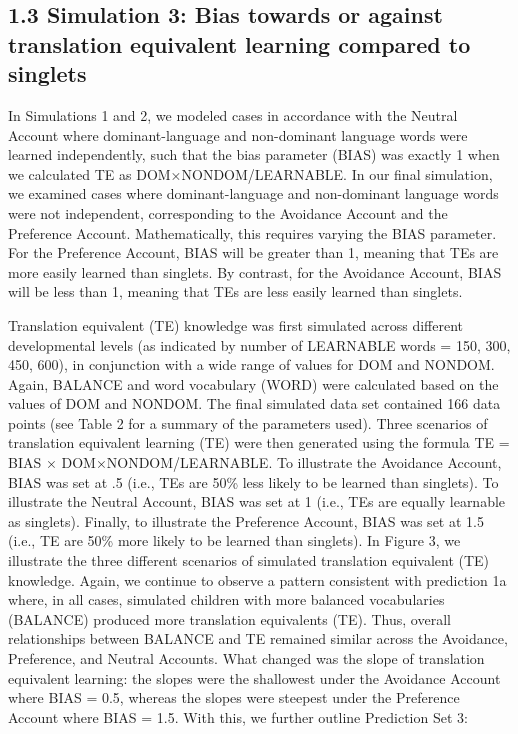 \documentclass[
  english,
  ,man,floatsintext]{apa6}
\begin{document}
\hypertarget{simulation-3-bias-towards-or-against-translation-equivalent-learning-compared-to-singlets}{%
\subsection{1.3 Simulation 3: Bias towards or against translation equivalent learning compared to singlets}\label{simulation-3-bias-towards-or-against-translation-equivalent-learning-compared-to-singlets}}

In Simulations 1 and 2, we modeled cases in accordance with the Neutral Account where dominant-language and non-dominant language words were learned independently, such that the bias parameter (BIAS) was exactly 1 when we calculated TE as DOM×NONDOM/LEARNABLE. In our final simulation, we examined cases where dominant-language and non-dominant language words were not independent, corresponding to the Avoidance Account and the Preference Account. Mathematically, this requires varying the BIAS parameter. For the Preference Account, BIAS will be greater than 1, meaning that TEs are more easily learned than singlets. By contrast, for the Avoidance Account, BIAS will be less than 1, meaning that TEs are less easily learned than singlets.

Translation equivalent (TE) knowledge was first simulated across different developmental levels (as indicated by number of LEARNABLE words = 150, 300, 450, 600), in conjunction with a wide range of values for DOM and NONDOM. Again, BALANCE and word vocabulary (WORD) were calculated based on the values of DOM and NONDOM. The final simulated data set contained 166 data points (see Table 2 for a summary of the parameters used). Three scenarios of translation equivalent learning (TE) were then generated using the formula TE = BIAS × DOM×NONDOM/LEARNABLE. To illustrate the Avoidance Account, BIAS was set at .5 (i.e., TEs are 50\% less likely to be learned than singlets). To illustrate the Neutral Account, BIAS was set at 1 (i.e., TEs are equally learnable as singlets). Finally, to illustrate the Preference Account, BIAS was set at 1.5 (i.e., TE are 50\% more likely to be learned than singlets). In Figure 3, we illustrate the three different scenarios of simulated translation equivalent (TE) knowledge. Again, we continue to observe a pattern consistent with prediction 1a where, in all cases, simulated children with more balanced vocabularies (BALANCE) produced more translation equivalents (TE). Thus, overall relationships between BALANCE and TE remained similar across the Avoidance, Preference, and Neutral Accounts. What changed was the slope of translation equivalent learning: the slopes were the shallowest under the Avoidance Account where BIAS = 0.5, whereas the slopes were steepest under the Preference Account where BIAS = 1.5. With this, we further outline Prediction Set 3:
\end{document}
